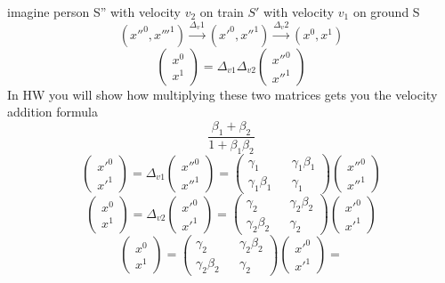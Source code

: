 \documentclass{report}
\begin{document}
imagine person S'' with velocity $v_2$ on train $S'$ with velocity $v_1$ on ground S
\[
(x''^0, x'''^1) \overset{\Delta_v1}{\rightarrow} (x'^0, x''^1) \overset{\Delta_v2}{\rightarrow}(x^0, x^1)
\]
\[
\begin{pmatrix}
x^0 \\ x^1
\end{pmatrix}
=
\Delta_{v1} \Delta_{v2}
\begin{pmatrix}
x''^0 \\ x''^1
\end{pmatrix}
\]
In HW you will show how multiplying these two matrices gets you the velocity addition formula
\[
\frac{\beta_1 + \beta_2}{1 + \beta_1 \beta_2}
\]
\[
\begin{pmatrix}
x'^0 \\ x'^1 
\end{pmatrix}
=
\Delta_{v1}
\begin{pmatrix}
x''^0 \\ x''^1 
\end{pmatrix}
=
\begin{pmatrix}
\gamma_1 && \gamma_1 \beta_1 \\
 \gamma_1\beta_1 && \gamma_1
 \end{pmatrix}
\begin{pmatrix}
x''^0 \\ x''^1 
\end{pmatrix}
\]
\[
\begin{pmatrix}
x^0 \\ x^1 
\end{pmatrix}
=
\Delta_{v2}
\begin{pmatrix}
x'^0 \\ x'^1 
\end{pmatrix}
=
\begin{pmatrix}
\gamma_2 && \gamma_2 \beta_2 \\
 \gamma_2\beta_2 && \gamma_2
 \end{pmatrix}
\begin{pmatrix}
x'^0 \\ x'^1 
\end{pmatrix}
\]
\[
\begin{pmatrix}
x^0 \\ x^1
\end{pmatrix}
=
\begin{pmatrix}
\gamma_2 && \gamma_2 \beta_2 \\
 \gamma_2\beta_2 && \gamma_2
 \end{pmatrix}
\begin{pmatrix}
x'^0 \\ x'^1 
\end{pmatrix}
=
\]
\end{document}
